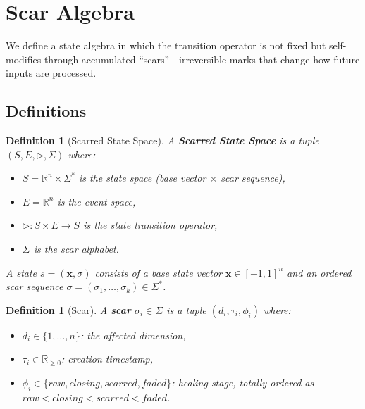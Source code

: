 \documentclass[11pt]{article}
\newtheorem{definition}[theorem]{Definition}
\begin{document}
\section{Scar Algebra}
\label{sec:scar}

We define a state algebra in which the transition operator is not fixed but self-modifies through accumulated ``scars''---irreversible marks that change how future inputs are processed.

\subsection{Definitions}

\begin{definition}[Scarred State Space]
\label{def:scar-space}
A \textbf{Scarred State Space} is a tuple $(S, E, \triangleright, \Sigma)$ where:
\begin{itemize}
\item $S = \mathbb{R}^n \times \Sigma^*$ is the state space (base vector $\times$ scar sequence),
\item $E = \mathbb{R}^n$ is the event space,
\item $\triangleright: S \times E \to S$ is the state transition operator,
\item $\Sigma$ is the scar alphabet.
\end{itemize}
A state $s = (\mathbf{x}, \sigma)$ consists of a base state vector $\mathbf{x} \in [-1,1]^n$ and an ordered scar sequence $\sigma = (\sigma_1, \ldots, \sigma_k) \in \Sigma^*$.
\end{definition}

\begin{definition}[Scar]
\label{def:scar}
A \textbf{scar} $\sigma_i \in \Sigma$ is a tuple $(d_i, \tau_i, \phi_i)$ where:
\begin{itemize}
\item $d_i \in \{1, \ldots, n\}$: the affected dimension,
\item $\tau_i \in \mathbb{R}_{\geq 0}$: creation timestamp,
\item $\phi_i \in \{raw, closing, scarred, faded\}$: healing stage, totally ordered as $raw < closing < scarred < faded$.
\end{itemize}
\end{definition}
\end{document}

